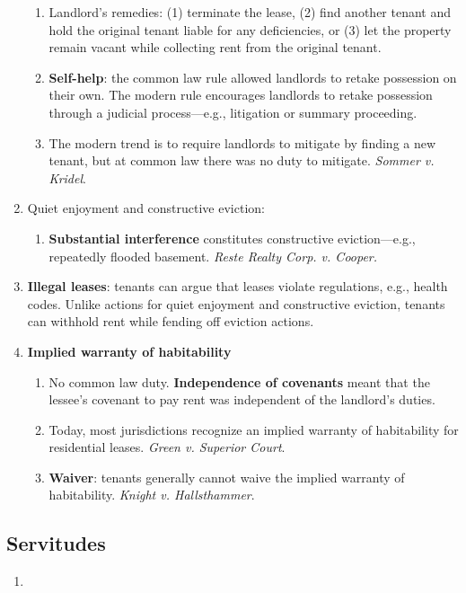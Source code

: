 \begin{enumerate}
\begin{enumerate}
        \item Landlord's remedies: (1) terminate the lease, (2) find another 
        tenant and hold the original tenant liable for any deficiencies, or 
        (3) let the property remain vacant while collecting rent from the 
        original tenant.
        \item \textbf{Self-help}: the common law rule allowed landlords to 
        retake possession on their own. The modern rule encourages landlords 
        to retake possession through a judicial process---e.g., litigation or 
        summary proceeding.
        \item The modern trend is to require landlords to mitigate by finding 
        a new tenant, but at common law there was no duty to mitigate. 
        \emph{Sommer v. Kridel}.
    \end{enumerate}
    \item Quiet enjoyment and constructive eviction:
    \begin{enumerate}
        \item \textbf{Substantial interference} constitutes constructive 
        eviction---e.g., repeatedly flooded basement. \emph{Reste Realty Corp. 
        v. Cooper.}
    \end{enumerate}
    \item \textbf{Illegal leases}: tenants can argue that leases violate 
    regulations, e.g., health codes. Unlike actions for quiet enjoyment and 
    constructive eviction, tenants can withhold rent while fending off 
    eviction actions.
    \item \textbf{Implied warranty of habitability}
    \begin{enumerate}
        \item No common law duty. \textbf{Independence of covenants} meant 
        that the lessee's covenant to pay rent was independent of the 
        landlord's duties.
        \item Today, most jurisdictions recognize an implied warranty of 
        habitability for residential leases. \emph{Green v. Superior Court}.
        \item \textbf{Waiver}: tenants generally cannot waive the implied 
        warranty of habitability. \emph{Knight v. Hallsthammer}. %
    \end{enumerate}
\end{enumerate}

\subsection{Servitudes}

\begin{enumerate}
    \item %
\end{enumerate}
